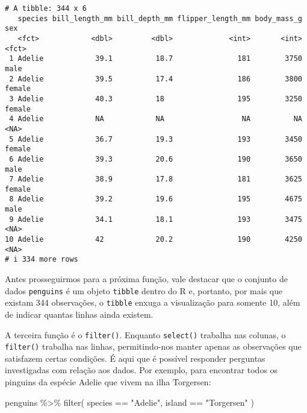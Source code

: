 \documentclass[
  12pt,
  letterpaper,
  DIV=11,
  numbers=noendperiod]{scrreprt}
\newenvironment{Shaded}{\begin{snugshade}}{\end{snugshade}}
\newcommand{\FunctionTok}[1]{\textcolor[rgb]{0.28,0.35,0.67}{#1}}
\newcommand{\NormalTok}[1]{\textcolor[rgb]{0.00,0.23,0.31}{#1}}
\newcommand{\SpecialCharTok}[1]{\textcolor[rgb]{0.37,0.37,0.37}{#1}}
\newcommand{\StringTok}[1]{\textcolor[rgb]{0.13,0.47,0.30}{#1}}
\begin{document}
\begin{verbatim}
# A tibble: 344 x 6
   species bill_length_mm bill_depth_mm flipper_length_mm body_mass_g sex   
   <fct>            <dbl>         <dbl>             <int>       <int> <fct> 
 1 Adelie            39.1          18.7               181        3750 male  
 2 Adelie            39.5          17.4               186        3800 female
 3 Adelie            40.3          18                 195        3250 female
 4 Adelie            NA            NA                  NA          NA <NA>  
 5 Adelie            36.7          19.3               193        3450 female
 6 Adelie            39.3          20.6               190        3650 male  
 7 Adelie            38.9          17.8               181        3625 female
 8 Adelie            39.2          19.6               195        4675 male  
 9 Adelie            34.1          18.1               193        3475 <NA>  
10 Adelie            42            20.2               190        4250 <NA>  
# i 334 more rows
\end{verbatim}

Antes prosseguirmos para a próxima função, vale destacar que o conjunto
de dados \texttt{penguins} é um objeto \texttt{tibble} dentro do R e,
portanto, por mais que existam 344 observações, o \texttt{tibble} enxuga
a visualização para somente 10, além de indicar quantas linhas ainda
existem.

A terceira função é o \texttt{filter()}. Enquanto \texttt{select()}
trabalha nas colunas, o \texttt{filter()} trabalha nas linhas,
permitindo-nos manter apenas as observações que satisfazem certas
condições. É aqui que é possível responder perguntas investigadas com
relação aos dados. Por exemplo, para encontrar todos os pinguins da
espécie Adelie que vivem na ilha Torgersen:

\begin{Shaded}
\begin{Highlighting}[]
\NormalTok{penguins }\SpecialCharTok{\%\textgreater{}\%} 
  \FunctionTok{filter}\NormalTok{(}
\NormalTok{      species }\SpecialCharTok{==} \StringTok{"Adelie"}\NormalTok{, island }\SpecialCharTok{==} \StringTok{"Torgersen"}
\NormalTok{    )}
\end{Highlighting}
\end{Shaded}
\end{document}
